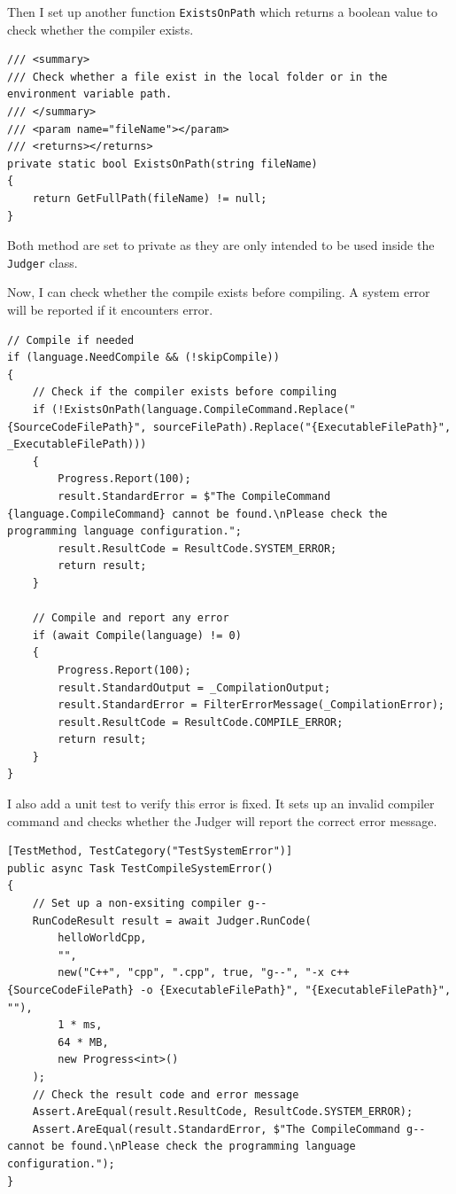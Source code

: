 \documentclass[a4paper]{report}
\newcommand{\code}{\texttt}
\begin{document}
Then I set up another function \code{ExistsOnPath} which returns a boolean value to check whether the compiler exists.

\begin{verbatim}
/// <summary>
/// Check whether a file exist in the local folder or in the environment variable path.
/// </summary>
/// <param name="fileName"></param>
/// <returns></returns>
private static bool ExistsOnPath(string fileName)
{
    return GetFullPath(fileName) != null;
}
\end{verbatim}

Both method are set to private as they are only intended to be used inside the \code{Judger} class.

Now, I can check whether the compile exists before compiling. A system error will be reported if it encounters error.

\begin{verbatim}
// Compile if needed
if (language.NeedCompile && (!skipCompile))
{
    // Check if the compiler exists before compiling
    if (!ExistsOnPath(language.CompileCommand.Replace("{SourceCodeFilePath}", sourceFilePath).Replace("{ExecutableFilePath}", _ExecutableFilePath)))
    {
        Progress.Report(100);
        result.StandardError = $"The CompileCommand {language.CompileCommand} cannot be found.\nPlease check the programming language configuration.";
        result.ResultCode = ResultCode.SYSTEM_ERROR;
        return result;
    }

    // Compile and report any error
    if (await Compile(language) != 0)
    {
        Progress.Report(100);
        result.StandardOutput = _CompilationOutput;
        result.StandardError = FilterErrorMessage(_CompilationError);
        result.ResultCode = ResultCode.COMPILE_ERROR;
        return result;
    }
}
\end{verbatim}

I also add a unit test to verify this error is fixed. It sets up an invalid compiler command and checks whether the Judger will report the correct error message.

\begin{verbatim}
[TestMethod, TestCategory("TestSystemError")]
public async Task TestCompileSystemError()
{
    // Set up a non-exsiting compiler g--
    RunCodeResult result = await Judger.RunCode(
        helloWorldCpp,
        "",
        new("C++", "cpp", ".cpp", true, "g--", "-x c++ {SourceCodeFilePath} -o {ExecutableFilePath}", "{ExecutableFilePath}", ""),
        1 * ms,
        64 * MB,
        new Progress<int>()
    );
    // Check the result code and error message
    Assert.AreEqual(result.ResultCode, ResultCode.SYSTEM_ERROR);
    Assert.AreEqual(result.StandardError, $"The CompileCommand g-- cannot be found.\nPlease check the programming language configuration.");
}
\end{verbatim}
\end{document}
